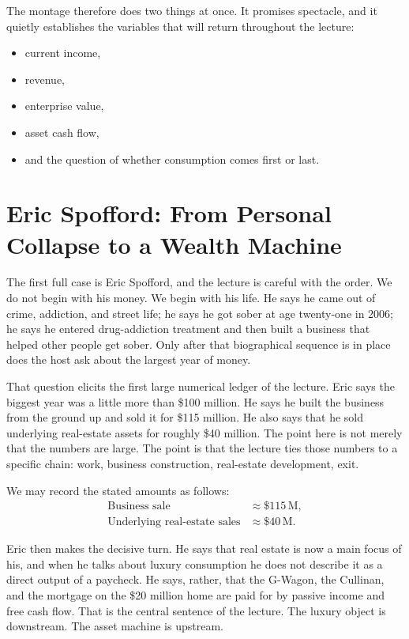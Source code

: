 The montage therefore does two things at once. It promises spectacle, and it quietly establishes the variables that will return throughout the lecture:
\begin{itemize}
\item current income,
\item revenue,
\item enterprise value,
\item asset cash flow,
\item and the question of whether consumption comes first or last.
\end{itemize}

\section{Eric Spofford: From Personal Collapse to a Wealth Machine}

The first full case is Eric Spofford, and the lecture is careful with the order. We do not begin with his money. We begin with his life. He says he came out of crime, addiction, and street life; he says he got sober at age twenty-one in 2006; he says he entered drug-addiction treatment and then built a business that helped other people get sober. Only after that biographical sequence is in place does the host ask about the largest year of money.

That question elicits the first large numerical ledger of the lecture. Eric says the biggest year was a little more than \$100 million. He says he built the business from the ground up and sold it for \$115 million. He also says that he sold underlying real-estate assets for roughly \$40 million. The point here is not merely that the numbers are large. The point is that the lecture ties those numbers to a specific chain: work, business construction, real-estate development, exit.

We may record the stated amounts as follows:
\begin{align}
\text{Business sale} &\approx \$115\,\text{M},\\
\text{Underlying real-estate sales} &\approx \$40\,\text{M}.
\end{align}

Eric then makes the decisive turn. He says that real estate is now a main focus of his, and when he talks about luxury consumption he does not describe it as a direct output of a paycheck. He says, rather, that the G-Wagon, the Cullinan, and the mortgage on the \$20 million home are paid for by passive income and free cash flow. That is the central sentence of the lecture. The luxury object is downstream. The asset machine is upstream.

